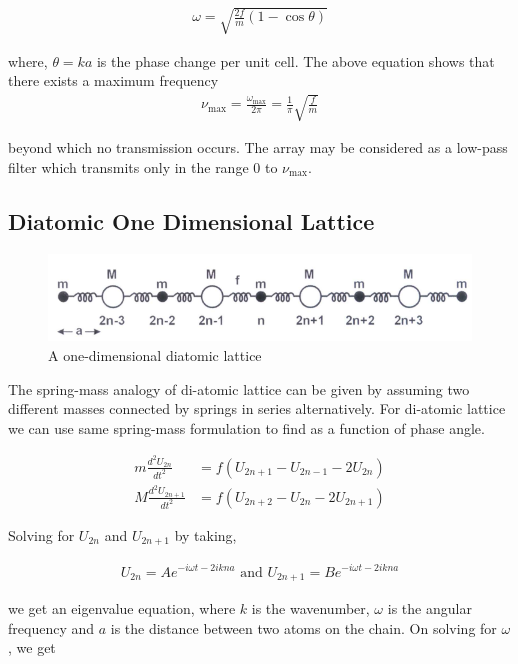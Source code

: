 \begin{align}
    \omega = \sqrt{\frac{2f}{m}(1-\cos \theta)}
\end{align}    

where, $\theta = ka$ is the phase change per unit cell. The above equation shows that there exists a maximum frequency
\begin{align}
    \nu_\text{max} = \frac{\omega_\text{max}}{2\pi} = \frac{1}{\pi}\sqrt{\frac{f}{m}}
\end{align}

beyond which no transmission occurs. The array may be considered as a low-pass filter which transmits only in the range $0$ to $\nu_\text{max}$.

\subsection{Diatomic One Dimensional Lattice}
\begin{figure}[H]
    \centering
    \includegraphics[width=1\columnwidth]{images/theory3.png}
    \caption{A one-dimensional diatomic lattice}
    \label{f2}
\end{figure}
The spring-mass analogy of di-atomic lattice can be given by assuming two different masses connected by springs in series alternatively. For di-atomic lattice we can use same spring-mass formulation to find as a function of phase angle.

\begin{align}
    m\frac{d^2U_{2n}}{dt^2} &= f(U_{2n+1}-U_{2n-1} - 2U_{2n})\\
    M\frac{d^2U_{2n+1}}{dt^2} &= f(U_{2n+2}-U_{2n} - 2U_{2n+1})
\end{align}

Solving for $U_{2n}$ and $U_{2n+1}$ by taking,

\begin{align}
    U_{2n} = Ae^{-i\omega t-2ikna} \text{ and } U_{2n+1} = Be^{-i\omega t-2ikna}
\end{align}

we get an eigenvalue equation, where $k$ is the wavenumber, $\omega$ is the angular frequency and $a$ is the distance between two atoms on the chain. On solving for $\omega$, we get 

